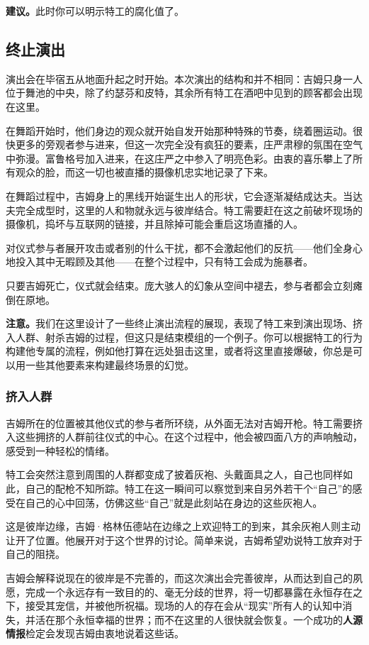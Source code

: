 \textbf{建议。}此时你可以明示特工的腐化值了。

\subsection{终止演出}

演出会在毕宿五从地面升起之时开始。本次演出的结构和并不相同：吉姆只身一人位于舞池的中央，除了约瑟芬和皮特，其余所有特工在酒吧中见到的顾客都会出现在这里。

在舞蹈开始时，他们身边的观众就开始自发开始那种特殊的节奏，绕着圈运动。很快更多的旁观者参与进来，但这一次完全没有疯狂的要素，庄严肃穆的氛围在空气中弥漫。富鲁格号加入进来，在这庄严之中参入了明亮色彩。由衷的喜乐攀上了所有观众的脸，而这一切也被直播的摄像机忠实地记录了下来。

在舞蹈过程中，吉姆身上的黑线开始诞生出人的形状，它会逐渐凝结成达夫。当达夫完全成型时，这里的人和物就永远与彼岸结合。特工需要赶在这之前破坏现场的摄像机，捣坏与互联网的链接，并且除掉可能会重启这场直播的人。

对仪式参与者展开攻击或者别的什么干扰，都不会激起他们的反抗——他们全身心地投入其中无暇顾及其他——在整个过程中，只有特工会成为施暴者。

只要吉姆死亡，仪式就会结束。庞大骇人的幻象从空间中褪去，参与者都会立刻瘫倒在原地。

\textbf{注意。}我们在这里设计了一些终止演出流程的展现，表现了特工来到演出现场、挤入人群、射杀吉姆的过程，但这只是结束模组的一个例子。你可以根据特工的行为构建他专属的流程，例如他打算在远处狙击这里，或者将这里直接爆破，你总是可以用一些其他要素来构建最终场景的幻觉。

\subsubsection{挤入人群}

吉姆所在的位置被其他仪式的参与者所环绕，从外面无法对吉姆开枪。特工需要挤入这些拥挤的人群前往仪式的中心。在这个过程中，他会被四面八方的声响触动，感受到一种轻松的情绪。

特工会突然注意到周围的人群都变成了披着灰袍、头戴面具之人，自己也同样如此，自己的配枪不知所踪。特工在这一瞬间可以察觉到来自另外若干个“自己”的感受在自己的心中回荡，仿佛这些“自己”就是此刻站在身边的这些灰袍人。

这是彼岸边缘，吉姆·格林伍德站在边缘之上欢迎特工的到来，其余灰袍人则主动让开了位置。他展开对于这个世界的讨论。简单来说，吉姆希望劝说特工放弃对于自己的阻挠。

吉姆会解释说现在的彼岸是不完善的，而这次演出会完善彼岸，从而达到自己的夙愿，完成一个永远存有一致目的的、毫无分歧的世界，将一切都暴露在永恒存在之下，接受其宠信，并被他所祝福。现场的人的存在会从“现实”所有人的认知中消失，并活在那个永恒幸福的世界；而不在这里的人很快就会恢复。一个成功的\textbf{人源情报}检定会发现吉姆由衷地说着这些话。

